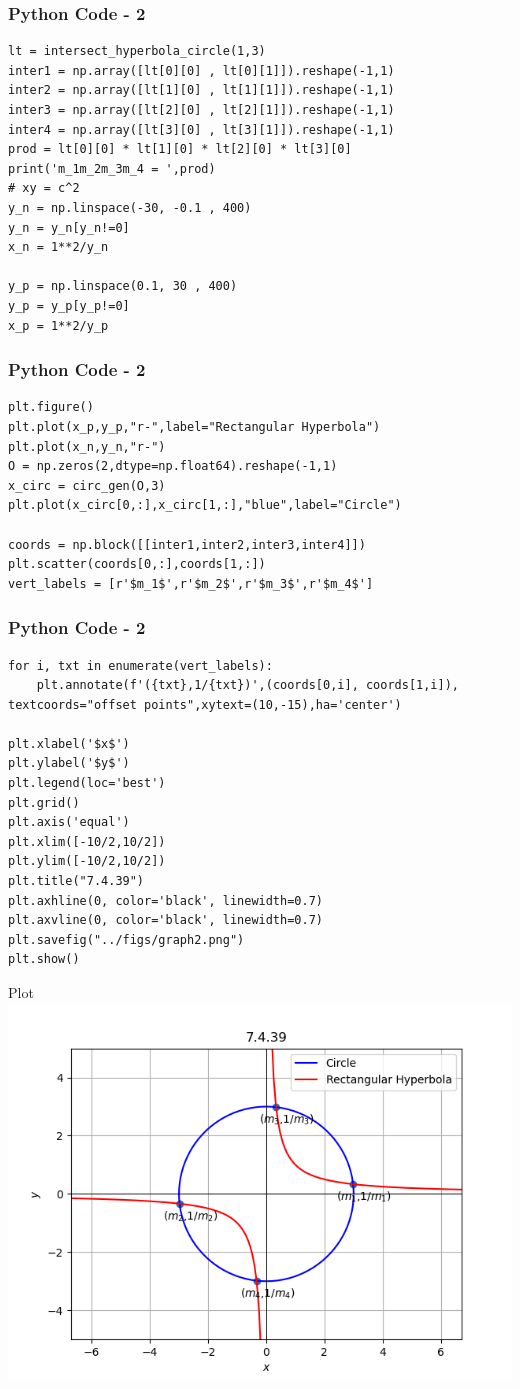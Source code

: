 \documentclass{beamer}
\begin{document}
\begin{frame}[fragile]
    \frametitle{Python Code - 2}
    \begin{lstlisting}
lt = intersect_hyperbola_circle(1,3)
inter1 = np.array([lt[0][0] , lt[0][1]]).reshape(-1,1)
inter2 = np.array([lt[1][0] , lt[1][1]]).reshape(-1,1)
inter3 = np.array([lt[2][0] , lt[2][1]]).reshape(-1,1)
inter4 = np.array([lt[3][0] , lt[3][1]]).reshape(-1,1)
prod = lt[0][0] * lt[1][0] * lt[2][0] * lt[3][0] 
print('m_1m_2m_3m_4 = ',prod)
# xy = c^2 
y_n = np.linspace(-30, -0.1 , 400)
y_n = y_n[y_n!=0]
x_n = 1**2/y_n 
 
y_p = np.linspace(0.1, 30 , 400)
y_p = y_p[y_p!=0]
x_p = 1**2/y_p
\end{lstlisting}
\end{frame}
\begin{frame}[fragile]
    \frametitle{Python Code - 2}
    \begin{lstlisting}
plt.figure()
plt.plot(x_p,y_p,"r-",label="Rectangular Hyperbola")
plt.plot(x_n,y_n,"r-")
O = np.zeros(2,dtype=np.float64).reshape(-1,1)
x_circ = circ_gen(O,3)
plt.plot(x_circ[0,:],x_circ[1,:],"blue",label="Circle")

coords = np.block([[inter1,inter2,inter3,inter4]])
plt.scatter(coords[0,:],coords[1,:])
vert_labels = [r'$m_1$',r'$m_2$',r'$m_3$',r'$m_4$']
\end{lstlisting}
\end{frame}
\begin{frame}[fragile]
    \frametitle{Python Code - 2}
    \begin{lstlisting}
for i, txt in enumerate(vert_labels):
    plt.annotate(f'({txt},1/{txt})',(coords[0,i], coords[1,i]),            textcoords="offset points",xytext=(10,-15),ha='center')

plt.xlabel('$x$')
plt.ylabel('$y$')
plt.legend(loc='best')
plt.grid() 
plt.axis('equal')
plt.xlim([-10/2,10/2])
plt.ylim([-10/2,10/2])
plt.title("7.4.39")
plt.axhline(0, color='black', linewidth=0.7)
plt.axvline(0, color='black', linewidth=0.7)
plt.savefig("../figs/graph2.png")
plt.show()
\end{lstlisting}
\end{frame}

 \begin{frame}{Plot}
    \centering
    \includegraphics[width=\columnwidth, height=0.8\textheight, keepaspectratio]{../figs/graph1.png}   
\end{frame}
\end{document}
